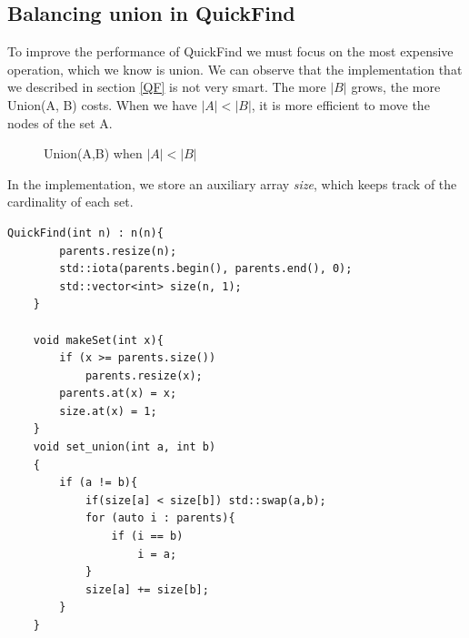 \documentclass{article}
\begin{document}
\subsection{Balancing union in QuickFind}
To improve the performance of QuickFind we must focus on the most expensive operation, which we know is 
union. We can observe that the implementation that we described in section \ref{QF} is not very smart. The more $ | B | $ grows, the more
Union(A, B) costs. When we have $|A| < |B| $, it is more efficient to move the nodes of the set A.

\begin{figure}[h!]
    \centering
    \caption{Union(A,B) when $|A| < |B|$}
    \label{fig:qfsize}
\end{figure}
In the implementation, we store an auxiliary array \emph{size}, which keeps track
of the cardinality of each set.

\begin{lstlisting}[caption=updated operations in QuickFind, label=lab:qfu]
    QuickFind(int n) : n(n){
        parents.resize(n);
        std::iota(parents.begin(), parents.end(), 0);
        std::vector<int> size(n, 1);
    }

    void makeSet(int x){
        if (x >= parents.size())
            parents.resize(x);
        parents.at(x) = x;
        size.at(x) = 1;
    }
    void set_union(int a, int b)
    {
        if (a != b){
            if(size[a] < size[b]) std::swap(a,b);
            for (auto i : parents){
                if (i == b)
                    i = a;
            }
            size[a] += size[b];
        }
    }
    
\end{lstlisting}
\end{document}

